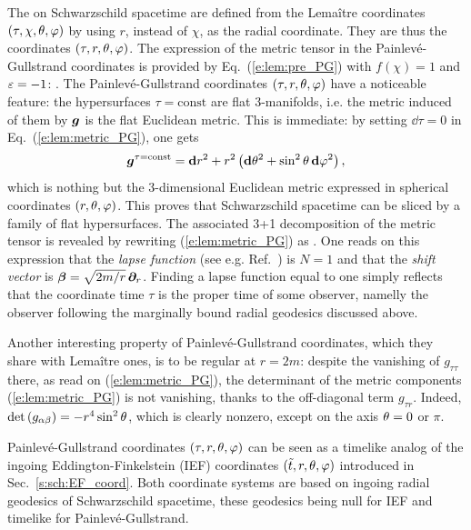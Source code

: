 The 
on Schwarzschild spacetime are defined from the Lemaître coordinates $(\tau,\chi,\theta,\varphi)$
by using $r$, instead of $\chi$, as
the radial coordinate. They are thus the coordinates $(\tau,r,\theta,\varphi)$.
The expression of the metric tensor in the Painlevé-Gullstrand coordinates
is provided by Eq.~(\ref{e:lem:pre_PG}) with $f(\chi) = 1$ and $\varepsilon=-1$:
\be \label{e:lem:metric_PG}
    .
\ee
The Painlevé-Gullstrand coordinates $(\tau,r,\theta,\varphi)$
have a noticeable feature: the hypersurfaces $\tau=\mathrm{const}$ are
flat 3-manifolds, i.e. the metric induced of them by $\bm{g}$ is the flat Euclidean metric.
This is immediate: by setting $\dd\tau=0$ in Eq.~(\ref{e:lem:metric_PG}), one gets
\[
    \bm{g}^{\tau=\mathrm{const}} = \mathbf{d} r^2 + r^2 \left( \mathbf{d}\theta^2 + \sin^2\theta\, \mathbf{d}\varphi^2 \right) ,
\]
which is nothing but the 3-dimensional Euclidean metric expressed in spherical coordinates
$(r,\theta,\varphi)$. This proves that Schwarzschild spacetime can be sliced
by a family of flat hypersurfaces. The associated 3+1 decomposition
of the metric tensor is revealed by rewriting (\ref{e:lem:metric_PG})
as
\be
        .
\ee
One reads on this expression that the \emph{lapse function}
(see e.g. Ref.~\cite{Gourg12}) is $N=1$ and that the \emph{shift vector}
is $\bm{\beta} = \sqrt{2m/r}\, \bm{\partial}_r$. Finding a lapse function equal to one simply reflects
that the coordinate time $\tau$ is the proper time of some observer, namelly the observer
following the marginally bound radial geodesics discussed above.

Another interesting property of Painlevé-Gullstrand coordinates, which they
share with Lemaître ones, is to be regular at $r=2m$: despite the vanishing of
$g_{\tau\tau}$ there, as read on (\ref{e:lem:metric_PG}), the determinant
of the metric components (\ref{e:lem:metric_PG}) is not vanishing,
thanks to the off-diagonal term $g_{\tau r}$. Indeed, $\det\left( g_{\alpha\beta}\right) = -r^4\sin^2\theta$, which is clearly nonzero, except on the
axis $\theta=0$ or $\pi$.

\begin{remark}
Painlevé-Gullstrand coordinates $(\tau,r,\theta,\varphi)$ can be seen as a timelike analog of the
ingoing
Eddington-Finkelstein (IEF) coordinates $(\tilde{t},r,\theta,\varphi)$ introduced in Sec.~\ref{s:sch:EF_coord}. Both coordinate
systems are based on ingoing radial geodesics of Schwarzschild spacetime, these
geodesics being null for IEF and timelike for Painlevé-Gullstrand.
\end{remark}

